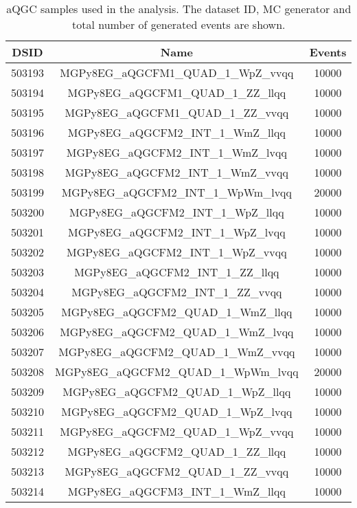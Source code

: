 \begin{table}[!htbp]
\begin{center}
\small
\caption{
aQGC samples used in the analysis. The dataset ID, MC generator and total number of generated events are shown.
}
\begin{tabular}{c|c|c}
\hline

\hline
DSID & Name & Events  \\
\hline

503193 & MGPy8EG\_aQGCFM1\_QUAD\_1\_WpZ\_vvqq    & 10000 \\
503194 & MGPy8EG\_aQGCFM1\_QUAD\_1\_ZZ\_llqq     & 10000 \\
503195 & MGPy8EG\_aQGCFM1\_QUAD\_1\_ZZ\_vvqq     & 10000 \\
503196 & MGPy8EG\_aQGCFM2\_INT\_1\_WmZ\_llqq     & 10000 \\
503197 & MGPy8EG\_aQGCFM2\_INT\_1\_WmZ\_lvqq     & 10000 \\
503198 & MGPy8EG\_aQGCFM2\_INT\_1\_WmZ\_vvqq     & 10000 \\
503199 & MGPy8EG\_aQGCFM2\_INT\_1\_WpWm\_lvqq    & 20000 \\
503200 & MGPy8EG\_aQGCFM2\_INT\_1\_WpZ\_llqq     & 10000 \\
503201 & MGPy8EG\_aQGCFM2\_INT\_1\_WpZ\_lvqq     & 10000 \\
503202 & MGPy8EG\_aQGCFM2\_INT\_1\_WpZ\_vvqq     & 10000 \\
503203 & MGPy8EG\_aQGCFM2\_INT\_1\_ZZ\_llqq      & 10000 \\
503204 & MGPy8EG\_aQGCFM2\_INT\_1\_ZZ\_vvqq      & 10000 \\
503205 & MGPy8EG\_aQGCFM2\_QUAD\_1\_WmZ\_llqq    & 10000 \\
503206 & MGPy8EG\_aQGCFM2\_QUAD\_1\_WmZ\_lvqq    & 10000 \\
503207 & MGPy8EG\_aQGCFM2\_QUAD\_1\_WmZ\_vvqq    & 10000 \\
503208 & MGPy8EG\_aQGCFM2\_QUAD\_1\_WpWm\_lvqq   & 20000 \\
503209 & MGPy8EG\_aQGCFM2\_QUAD\_1\_WpZ\_llqq    & 10000 \\
503210 & MGPy8EG\_aQGCFM2\_QUAD\_1\_WpZ\_lvqq    & 10000 \\
503211 & MGPy8EG\_aQGCFM2\_QUAD\_1\_WpZ\_vvqq    & 10000 \\
503212 & MGPy8EG\_aQGCFM2\_QUAD\_1\_ZZ\_llqq     & 10000 \\
503213 & MGPy8EG\_aQGCFM2\_QUAD\_1\_ZZ\_vvqq     & 10000 \\
503214 & MGPy8EG\_aQGCFM3\_INT\_1\_WmZ\_llqq     & 10000 \\

\end{tabular}
\end{center}
\end{table}
